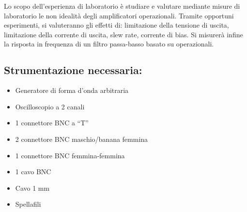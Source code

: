 Lo scopo dell'esperienza di laboratorio è studiare e valutare mediante misure di laboratorio le non idealità degli amplificatori operazionali. Tramite opportuni esperimenti, si valuteranno gli effetti di: limitazione della tensione di uscita, limitazione della corrente di uscita, slew rate, corrente di bias. Si misurerà infine la risposta in frequenza di un filtro passa-basso basato su operazionali.
\subsection*{Strumentazione necessaria:}
\begin{itemize}
    \item Generatore di forma d'onda arbitraria
    \item Oscilloscopio a 2 canali
    \item 1 connettore BNC a “T”
	\item 2 connettore BNC maschio/banana femmina
	\item 1 connettore BNC femmina-femmina
	\item 1 cavo BNC
	\item Cavo 1 mm
	\item Spellafili
\end{itemize}
